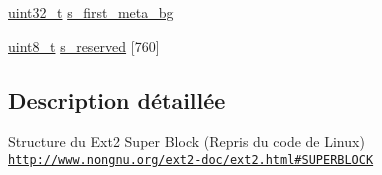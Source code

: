 \begin{DoxyCompactItemize}
\item 
\hyperlink{kernel_2include_2types_8h_a33594304e786b158f3fb30289278f5af}{uint32\-\_\-t} \hyperlink{structext2__super__block_a436c7c8af548ade7f8045e88c2861d61}{s\-\_\-first\-\_\-meta\-\_\-bg}
\item 
\hyperlink{kernel_2include_2types_8h_aba7bc1797add20fe3efdf37ced1182c5}{uint8\-\_\-t} \hyperlink{structext2__super__block_a17e0d263a7fceb8b53aff24b66c216df}{s\-\_\-reserved} \mbox{[}760\mbox{]}
\end{DoxyCompactItemize}


\subsection{Description détaillée}
Structure du Ext2 Super Block (Repris du code de Linux) \href{http://www.nongnu.org/ext2-doc/ext2.html#SUPERBLOCK}{\tt http\-://www.\-nongnu.\-org/ext2-\/doc/ext2.\-html\#\-S\-U\-P\-E\-R\-B\-L\-O\-C\-K} 


